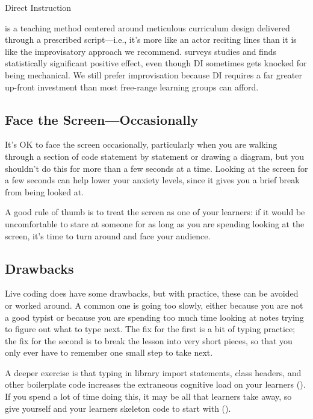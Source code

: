 \begin{callout}{Direct Instruction}

   is a teaching
  method centered around meticulous curriculum design delivered
  through a prescribed script---i.e., it's more like an actor reciting
  lines than it is like the improvisatory approach we recommend.
  \cite{Stoc2018} surveys studies and finds statistically significant
  positive effect, even though DI sometimes gets knocked for being
  mechanical.  We still prefer improvisation because DI requires a far
  greater up-front investment than most free-range learning groups can
  afford.
  
\end{callout}

\subsection*{Face the Screen---Occasionally}

It's OK to face the screen occasionally, particularly when you are
walking through a section of code statement by statement or drawing a
diagram, but you shouldn't do this for more than a few seconds at a
time. Looking at the screen for a few seconds can help lower your
anxiety levels, since it gives you a brief break from being looked at.

A good rule of thumb is to treat the screen as one of your learners: if
it would be uncomfortable to stare at someone for as long as you are
spending looking at the screen, it's time to turn around and face your
audience.

\subsection*{Drawbacks}

Live coding does have some drawbacks, but with practice, these can be
avoided or worked around.  A common one is going too slowly, either
because you are not a good typist or because you are spending too much
time looking at notes trying to figure out what to type next.  The fix
for the first is a bit of typing practice; the fix for the second is
to break the lesson into very short pieces, so that you only ever have
to remember one small step to take next.

A deeper exercise is that typing in library import statements, class
headers, and other boilerplate code increases the extraneous cognitive
load on your learners ().  If you spend a lot of time
doing this, it may be all that learners take away, so give yourself
and your learners skeleton code to start with
().

